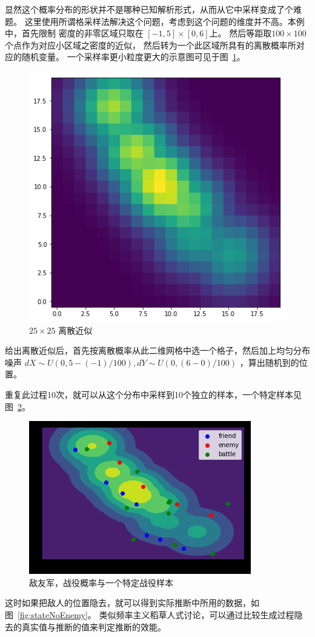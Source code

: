 \documentclass{article}
\begin{document}
显然这个概率分布的形状并不是哪种已知解析形式，从而从它中采样变成了个难题。 
这里使用所谓格采样法解决这个问题，考虑到这个问题的维度并不高。本例中，首先限制
密度的非零区域只取在 $[-1,5] \times [0,6]$上。
然后等距取$100 \times 100$个点作为对应小区域之密度的近似，
然后转为一个此区域所具有的离散概率所对应的随机变量。
一个采样率更小粒度更大的示意图可见于图~\ref{fig:gridify}。


\begin{figure}[ht]
\includegraphics[width=0.6\linewidth]{gridify.png}
\caption{$25 \times 25$ 离散近似}
\label{fig:gridify}
\end{figure}


给出离散近似后，首先按离散概率从此二维网格中选一个格子，然后加上均匀分布噪声 
$dX \sim U(0,5-(-1)/100),dY \sim U(0,(6-0)/100)$ ，算出随机到的位置。

重复此过程10次，就可以从这个分布中采样到10个独立的样本，一个特定样本见图~\ref{fig:stateSampleBattle}。


\begin{figure}[ht]
\includegraphics[width=0.6\linewidth]{state_sample_battle.png}
\caption{敌友军，战役概率与一个特定战役样本}
\label{fig:stateSampleBattle}
\end{figure}


这时如果把敌人的位置隐去，就可以得到实际推断中所用的数据，如图~\ref{fig:stateNoEnemy}。
类似频率主义稻草人式讨论，可以通过比较生成过程隐去的真实值与推断的值来判定推断的效能。
\end{document}
